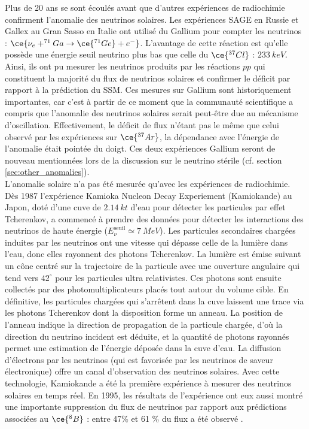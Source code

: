 Plus de 20 ans se sont écoulés avant que d'autres expériences de radiochimie confirment l'anomalie des neutrinos solaires. Les expériences SAGE en Russie \cite{Abazov:1991rx} et Gallex au Gran Sasso en Italie \cite{Hampel:1998xg} ont utilisé du Gallium pour compter les neutrinos : $\ce{\nu_e + ^{71}Ga \rightarrow \ce{^{71}Ge} + e^-}$. L'avantage de cette réaction est qu'elle possède une énergie seuil neutrino plus bas que celle du $\ce{^{37}Cl}$ : $\SI{233}{keV}$. Ainsi, ils ont pu mesurer les neutrinos produits par les réactions $pp$ qui constituent la majorité du flux de neutrinos solaires et confirmer le déficit par rapport à la prédiction du SSM. Ces mesures sur Gallium sont historiquement importantes, car c'est à partir de ce moment que la communauté scientifique a compris que l'anomalie des neutrinos solaires serait peut-être due au mécanisme d'oscillation. Effectivement, le déficit de flux n'étant pas le même que celui observé par les expériences sur $\ce{^{37}Ar}$, la dépendance avec l'énergie de l'anomalie était pointée du doigt. Ces deux expériences \og Gallium \fg{} seront de nouveau mentionnées lors de la discussion sur le neutrino stérile (cf. section \ref{sec:other_anomalies}).\\

L'anomalie solaire n'a pas été mesurée qu'avec les expériences de radiochimie. Dès 1987 l'expérience Kamioka Nucleon Decay Experiement (Kamiokande) au Japon, doté d'une cuve de $\SI{2,14}{kt}$ d'eau pour détecter les particules par effet Tcherenkov, a commencé à prendre des données pour détecter les interactions des neutrinos de haute énergie ($E_\nu^\textrm{seuil} \simeq \SI{7}{MeV}$). Les particules secondaires chargées induites par les neutrinos ont une vitesse qui dépasse celle de la lumière dans l'eau, donc elles rayonnent des photons Tcherenkov. La lumière est émise suivant un cône centré sur la trajectoire de la particule avec une ouverture angulaire qui tend vers $42^\circ$ pour les particules ultra relativistes. Ces photons sont ensuite collectés par des photomultiplicateurs placés tout autour du volume cible. En définitive, les particules chargées qui s'arrêtent dans la cuve laissent une trace via les photons Tcherenkov dont la disposition forme un anneau. La position de l'anneau indique la direction de propagation de la particule chargée, d'où la direction du neutrino incident est déduite, et la quantité de photons rayonnés permet une estimation de l'énergie déposée dans la cuve d'eau. La diffusion d'électrons par les neutrinos (qui est favorisée par les neutrinos de saveur électronique) offre un canal d'observation des neutrinos solaires. Avec cette technologie, Kamiokande a été la première expérience à mesurer des neutrinos solaires en temps réel. En 1995, les résultats de l'expérience ont eux aussi montré une importante suppression du flux de neutrinos par rapport aux prédictions associées au $\ce{^8B}$ : entre 47\% et 61 \% du flux a été observé \cite{Fukuda:1996sz}.\\


